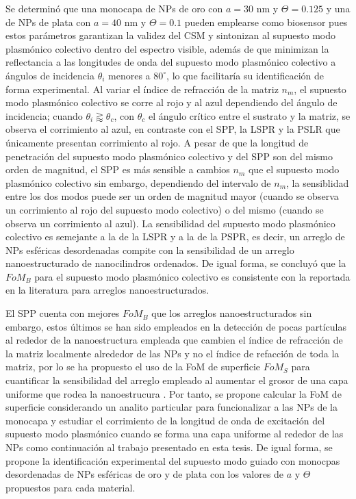 Se determinó que una monocapa de NPs de oro con $a=30$ nm y $\Theta=0.125$ y una de NPs de plata con $a=40$ nm y $\Theta=0.1$ pueden emplearse como biosensor pues estos parámetros garantizan la validez del CSM y sintonizan al supuesto modo plasmónico colectivo dentro del espectro visible, además de que minimizan la reflectancia a las longitudes de onda del supuesto modo plasmónico colectivo a ángulos de incidencia $\theta_i$ menores a $80^\circ$, lo que facilitaría su identificación de forma experimental. Al variar el índice de refracción de la matriz $n_m$, el supuesto modo plasmónico colectivo se corre al rojo y al azul dependiendo del ángulo de incidencia; cuando $\theta_i\gtrapprox\theta_c$, con $\theta_c$ el ángulo crítico entre el sustrato y la matriz, se observa el corrimiento al azul, en contraste con el SPP, la LSPR y la PSLR que únicamente presentan corrimiento al rojo. A pesar de que la longitud de penetración del supuesto modo plasmónico colectivo y del SPP son del mismo orden de magnitud, el SPP es más sensible a cambios $n_m$ que el supuesto modo plasmónico colectivo sin embargo, dependiendo del intervalo de $n_m$, la sensiblidad entre los dos modos puede ser un orden de magnitud mayor (cuando se observa un corrimiento al rojo del supuesto modo colectivo) o del mismo (cuando se observa un corrimiento al azul). La sensibilidad del supuesto modo  plasmónico colectivo es semejante a la de la LSPR y a la de la PSPR, es decir, un arreglo de NPs esféricas desordenadas compite con la sensibilidad de un arreglo nanoestructurado de nanocilindros ordenados. De igual forma, se concluyó que la $\textit{FoM}_B$ para el supuesto modo plasmónico colectivo es consistente con la reportada en la literatura para arreglos nanoestructurados.

El SPP cuenta con mejores $\textit{FoM}_B$ que los arreglos nanoestructurados sin embargo, estos últimos se han sido empleados en la detección de pocas partículas al rededor de la nanoestructura empleada que cambien el índice de refracción de la matriz localmente alrededor de las NPs y no el índice de refacción de toda la matriz, por lo se ha propuesto el uso de la FoM de superficie $\textit{FoM}_S$ para cuantificar la sensibilidad del arreglo empleado al aumentar el grosor de una capa uniforme que rodea la nanoestrucura \cite{estevez2014trends,svedendahl2009refractometric}. Por tanto, se propone calcular la FoM de superficie considerando un analito particular para funcionalizar a las NPs de la monocapa y estudiar el corrimiento de la longitud de onda de excitación del supuesto modo plasmónico cuando se forma una capa uniforme al rededor de las NPs como continuación al trabajo presentado en esta tesis. De igual forma, se propone la identificación experimental del supuesto modo guiado con monocpas desordenadas de NPs esféricas de oro y de plata con los valores de $a$ y $\Theta$ propuestos para cada material. 
